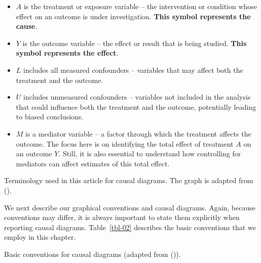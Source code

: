 \documentclass[
  singlecolumn]{article}
\providecommand{\tightlist}{%
  \setlength{\itemsep}{0pt}\setlength{\parskip}{0pt}}\usepackage{longtable,booktabs,array}
\begin{document}
\begin{itemize}
\tightlist
\item
  \textbf{\(A\)} is the treatment or exposure variable -- the
  intervention or condition whose effect on an outcome is under
  investigation. \textbf{This symbol represents the cause}.
\item
  \textbf{\(Y\)} is the outcome variable -- the effect or result that is
  being studied. \textbf{This symbol represents the effect}.
\item
  \textbf{\(L\)} includes all measured confounders -- variables that may
  affect both the treatment and the outcome.
\item
  \textbf{\(U\)} includes unmeasured confounders -- variables not
  included in the analysis that could influence both the treatment and
  the outcome, potentially leading to biased conclusions.
\item
  \textbf{\(M\)} is a mediator variable -- a factor through which the
  treatment affects the outcome. The focus here is on identifying the
  total effect of treatment \(A\) on an outcome \(Y\). Still, it is also
  essential to understand how controlling for mediators can affect
  estimates of this total effect.
\end{itemize}

\begin{table}

\caption{\label{tbl-01}Terminology used in this article for causal
diagrams. The graph is adapted from
().}

\centering{

\terminologylocalconventionssimple

}

\end{table}%

We next describe our graphical conventions and causal diagrams. Again,
because conventions may differ, it is always important to state them
explicitly when reporting causal diagrams. Table~\ref{tbl-02} describes
the basic conventions that we employ in this chapter.

\begin{table}

\caption{\label{tbl-02}Basic conventions for causal diagrams (adapted
from ()).}

\centering{

\terminologygeneralbasic

}

\end{table}%
\end{document}
